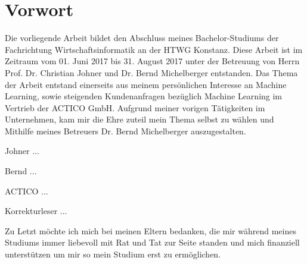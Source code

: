 \chapter*{Vorwort}

Die vorliegende Arbeit bildet den Abschluss meines Bachelor-Studiums der Fachrichtung Wirtschaftsinformatik an der HTWG Konstanz. Diese Arbeit ist im Zeitraum vom 01. Juni 2017 bis 31. August 2017 unter der Betreuung von Herrn Prof. Dr. Christian Johner und Dr. Bernd Michelberger entstanden. Das Thema der Arbeit entstand einerseits aus meinem persönlichen Interesse an Machine Learning, sowie steigenden Kundenanfragen bezüglich Machine Learning im Vertrieb der ACTICO GmbH. Aufgrund meiner vorigen Tätigkeiten im Unternehmen, kam mir die Ehre zuteil mein Thema selbst zu wählen und Mithilfe meines Betreuers Dr. Bernd Michelberger auszugestalten.

Johner ...

Bernd ... 

ACTICO ...

Korrekturleser ...

Zu Letzt möchte ich mich bei meinen Eltern bedanken, die mir während meines Studiums immer liebevoll mit Rat und Tat zur Seite standen und mich finanziell unterstützen um mir so mein Studium erst zu ermöglichen.  